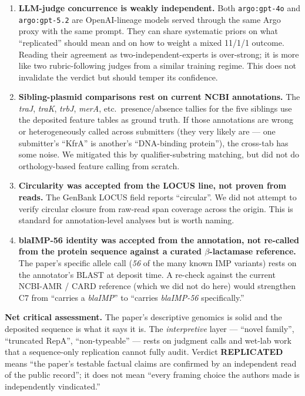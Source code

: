 \documentclass[11pt]{article}
\begin{document}
\begin{enumerate}[leftmargin=1.4em, label=\arabic*.]
  \item \textbf{LLM-judge concurrence is weakly independent.} Both \texttt{argo:gpt-4o} and
        \texttt{argo:gpt-5.2} are OpenAI-lineage models served through the same Argo proxy
        with the same prompt. They can share systematic priors on what ``replicated'' should
        mean and on how to weight a mixed 11/1/1 outcome. Reading their agreement as
        two-independent-experts is over-strong; it is more like two rubric-following judges
        from a similar training regime. This does not invalidate the verdict but should
        temper its confidence.

  \item \textbf{Sibling-plasmid comparisons rest on current NCBI annotations.} The
        \textit{traJ}, \textit{traK}, \textit{trbJ}, \textit{merA}, etc.\ presence/absence
        tallies for the five siblings use the deposited feature tables as ground truth. If
        those annotations are wrong or heterogeneously called across submitters (they very
        likely are --- one submitter's ``KfrA'' is another's ``DNA-binding protein''), the
        cross-tab has some noise. We mitigated this by qualifier-substring matching, but
        did not do orthology-based feature calling from scratch.

  \item \textbf{Circularity was accepted from the LOCUS line, not proven from reads.}
        The GenBank LOCUS field reports ``circular''. We did not attempt to verify circular
        closure from raw-read span coverage across the origin. This is standard for
        annotation-level analyses but is worth naming.

  \item \textbf{blaIMP-56 identity was accepted from the annotation, not re-called from
        the protein sequence against a curated $\beta$-lactamase reference.} The paper's
        specific allele call (\emph{56} of the many known IMP variants) rests on the
        annotator's BLAST at deposit time. A re-check against the current NCBI-AMR /
        CARD reference (which we did not do here) would strengthen C7 from ``carries a
        \textit{blaIMP}'' to ``carries \textit{blaIMP-56} specifically.''
\end{enumerate}

\noindent\textbf{Net critical assessment.} The paper's descriptive genomics is solid and
the deposited sequence is what it says it is. The \emph{interpretive} layer --- ``novel
family'', ``truncated RepA'', ``non-typeable'' --- rests on judgment calls and wet-lab
work that a sequence-only replication cannot fully audit. Verdict \textbf{REPLICATED}
means ``the paper's testable factual claims are confirmed by an independent read of the
public record''; it does not mean ``every framing choice the authors made is
independently vindicated.''
\end{document}
